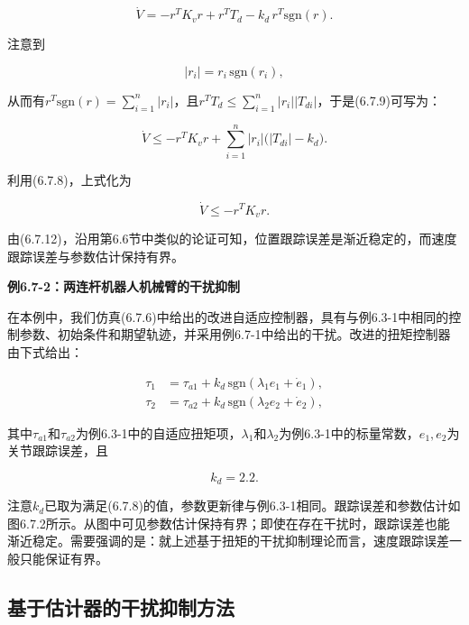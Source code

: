 \documentclass[12pt,a4paper]{ctexart}
\begin{document}
\begin{equation}\label{eq:6.7.9}
\dot{V} = -r^T K_v r + r^T T_d - k_d\, r^T \text{sgn}(r).
\end{equation}

注意到

\begin{equation}\label{eq:6.7.10}
|r_i| = r_i\, \text{sgn}(r_i),
\end{equation}

从而有$r^T \text{sgn}(r)=\sum_{i=1}^n |r_i|$，且$r^T T_d \leq \sum_{i=1}^n |r_i||T_{di}|$，于是(6.7.9)可写为：

\begin{equation}\label{eq:6.7.11}
\dot{V} \leq -r^T K_v r + \sum_{i=1}^n |r_i| \bigl( |T_{di}| - k_d \bigr).
\end{equation}

利用(6.7.8)，上式化为

\begin{equation}\label{eq:6.7.12}
\dot{V} \leq -r^T K_v r.
\end{equation}

由(6.7.12)，沿用第6.6节中类似的论证可知，位置跟踪误差是渐近稳定的，而速度跟踪误差与参数估计保持有界。

\textbf{例6.7-2：两连杆机器人机械臂的干扰抑制}

在本例中，我们仿真(6.7.6)中给出的改进自适应控制器，具有与例6.3-1中相同的控制参数、初始条件和期望轨迹，并采用例6.7-1中给出的干扰。改进的扭矩控制器由下式给出：

\begin{align}
\tau_1 &= \tau_{a1} + k_d\, \text{sgn}(\lambda_1 e_1 + \dot{e}_1), \\
\tau_2 &= \tau_{a2} + k_d\, \text{sgn}(\lambda_2 e_2 + \dot{e}_2),
\end{align}

其中$\tau_{a1}$和$\tau_{a2}$为例6.3-1中的自适应扭矩项，$\lambda_1$和$\lambda_2$为例6.3-1中的标量常数，$e_1,e_2$为关节跟踪误差，且

\begin{equation}\tag{3}
k_d = 2.2.
\end{equation}

注意$k_d$已取为满足(6.7.8)的值，参数更新律与例6.3-1相同。跟踪误差和参数估计如图6.7.2所示。从图中可见参数估计保持有界；即使在存在干扰时，跟踪误差也能渐近稳定。需要强调的是：就上述基于扭矩的干扰抑制理论而言，速度跟踪误差一般只能保证有界。

\subsection*{基于估计器的干扰抑制方法}
\end{document}
